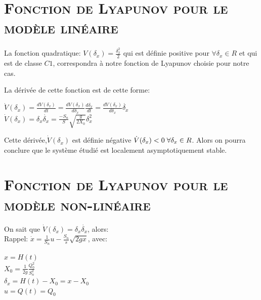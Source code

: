 \section{\textsc{Fonction de Lyapunov pour le modèle linéaire}}

	\paragraph{}
	La fonction quadratique: $V(\delta_x)=\frac{\delta_x^2}{2}$ qui est définie positive pour $\forall \delta_x \in R $ et qui est de classe $C1$, correspondra à notre fonction de Lyapunov choisie pour notre cas.\\

	\par	 La dérivée de cette fonction est de cette forme: 
	\begin{center}
		$\dot{V}(\delta_x) = \frac{dV(\delta_x)}{dt} = \frac{dV(\delta_x)}{d\delta_x} \frac{d\delta_x}{dt} = \frac{dV(\delta_x)}{d\delta_x} \dot{\delta_x} $\\[0.25 cm]
		$ \dot{V}(\delta_x) = \delta_x \dot{\delta_x} = \frac{-S_n}{S} \sqrt{\frac{g}{2X_0}} \delta_x^2 $\\[0.25 cm]
	\end{center} 
	\par Cette dérivée,$\dot{V}(\delta_x)$ est définie négative $\dot{V}(\delta_x)<0 \hspace{1mm} \forall \delta_x \in R $. Alors on pourra conclure que le système étudié est localement asymptotiquement stable.
	
\break
\section{\textsc{Fonction de Lyapunov pour le modèle non-linéaire}}
		
		\par On sait que  $\dot{V}(\delta_x) = \delta_x \dot{\delta_x} $, alors:\\

		Rappel: $ \dot{x}=\frac{1}{S_n} u - \frac{S_n}{s} \sqrt{2 g x}$, avec:
		\begin{center}
		 $ x = H(t)$ \\[0.25 cm]
		 $ X_0 = \frac{1}{2g} \frac{Q^2_0}{S^2_n}$ \\[0.25 cm]
		 $ \delta_x = H(t)-X_0 = x-X_0 $ \\[0.25 cm]
		 $ u = Q(t) = Q_0 $
		\end{center}
		
